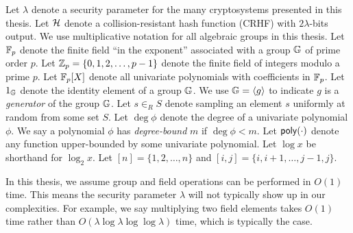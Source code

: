 Let $\lambda$ denote a security parameter for the many cryptosystems presented in this thesis.
Let $\mathcal{H}$ denote a collision-resistant hash function (CRHF) with $2\lambda$-bits output.
We use multiplicative notation for all algebraic groups in this thesis.
Let $\mathbb{F}_p$ denote the finite field ``in the exponent'' associated with a group $\mathbb{G}$ of prime order $p$.
Let $\mathbb{Z}_p=\{0,1,2,\dots,p-1\}$ denote the finite field of integers modulo a prime $p$.
Let $\mathbb{F}_p[X]$ denote all univariate polynomials with coefficients in $\mathbb{F}_p$.
Let $1_{\mathbb{G}}$ denote the identity element of a group $\mathbb{G}$.
We use $\mathbb{G} = \langle g \rangle$ to indicate $g$ is a \textit{generator} of the group $\mathbb{G}$.
Let $s \in_R S$ denote sampling an element $s$ uniformly at random from some set $S$.
Let $\deg{\phi}$ denote the degree of a univariate polynomial $\phi$.
We say a polynomial $\phi$ has \textit{degree-bound} $m$ if $\deg{\phi} < m$.
Let $\mathsf{poly}(\cdot)$ denote any function upper-bounded by some univariate polynomial.
Let $\log{x}$ be shorthand for $\log_2{x}$.
Let $[n] = \{1,2,\dots,n\}$ and $[i,j] = \{i,i+1,\dots,j-1,j\}$.

In this thesis, we assume group and field operations can be performed in $O(1)$ time.
This means the security parameter $\lambda$ will not typically show up in our complexities.
For example, we say multiplying two field elements takes $O(1)$ time rather than  $O(\lambda\log\lambda\log\log\lambda)$ time, which is typically the case.


